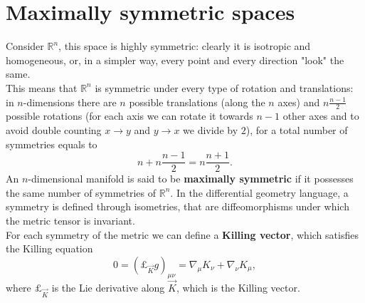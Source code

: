\appendix
\section{Maximally symmetric spaces}
Consider $\mathbb{R}^n$, this space is highly symmetric: clearly it is isotropic and homogeneous, or, in a simpler way, every point and every direction "look" the same.\\
This means that $\mathbb{R}^n$ is symmetric under every type of rotation and translations: in $n$-dimensions there are $n$ possible translations (along the $n$ axes) and $n\frac{n-1}{2}$ possible rotations (for each axis we can rotate it towards $n-1$ other axes and to avoid double counting $x\rightarrow y$ and $y\rightarrow x$ we divide by $2$), for a total number of symmetries equals to $$n+n\frac{n-1}{2}=n\frac{n+1}{2}.$$ 
An $n$-dimensional manifold is said to be \textbf{maximally symmetric} if it possesses the same number of symmetries of $\mathbb{R}^n$. In the differential geometry language, a symmetry is defined through isometries, that are diffeomorphisms under which the metric tensor is invariant.\\
For each symmetry of the metric we can define a \textbf{Killing vector}, which satisfies the Killing equation 
\begin{equation}
    0=(\pounds_{\vec K}g)_{\mu\nu}=\nabla_\mu K_\nu+\nabla_\nu K_\mu, \label{KillingEq}
\end{equation}
where $\pounds_{\vec{K}}$ is the Lie derivative along $\vec K$, which is the Killing vector.\\

